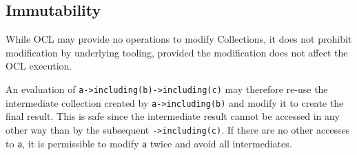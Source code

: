 \documentclass{llncs}
\begin{document}





\subsection{Immutability}

While OCL may provide no operations to modify Collections, it does not prohibit modification by underlying tooling, provided the modification does not affect the OCL execution.

An evaluation of \verb$a->including(b)->including(c)$ may therefore re-use the intermediate collection created by \verb$a->including(b)$ and modify it to create the final result. This is safe since the intermediate result cannot be accessed in any other way than by the subsequent \verb$->including(c)$. If there are no other accesses to \verb$a$, it is permissible to
modify \verb$a$ twice and avoid all intermediates.
\end{document}
